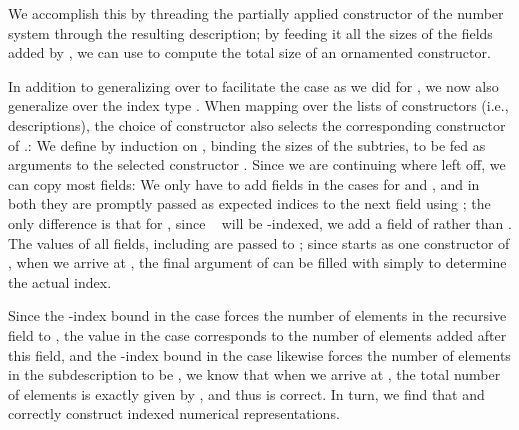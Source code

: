 We accomplish this by threading the partially applied constructor  of the number system  through the resulting description; by feeding it all the sizes of the fields added by , we can use  to compute the total size of an ornamented constructor.

In addition to generalizing over  to facilitate the  case as we did for , we now also generalize over the index type . When mapping over the lists of constructors (i.e., descriptions), the choice of constructor also selects the corresponding constructor of .:
We define  by induction on , binding the sizes of the subtries, to be fed as arguments to the selected constructor . Since we are continuing where  left off, we can copy most fields:
We only have to add fields in the cases for  and , and in both they are promptly passed as expected indices to the next field using ; the only difference is that for , since \  will be -indexed, we add a field of  rather than . The values of all fields, including  are passed to ; since  starts as one constructor  of , when we arrive at , the final argument of  can be filled with simply  to determine the actual index.

Since the -index  bound in the  case forces the number of elements in the recursive field to , the value in the  case corresponds to the number of elements added after this field, and the -index  bound in the  case likewise forces the number of elements in the subdescription to be , we know that when we arrive at , the total number of elements is exactly given by , and thus  is correct. In turn, we find that  and  correctly construct indexed numerical representations.

